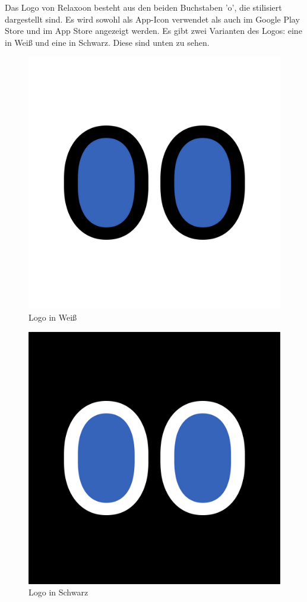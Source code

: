 Das Logo von Relaxoon besteht aus den beiden Buchstaben 'o', die stilisiert dargestellt sind.
Es wird sowohl als App-Icon verwendet als auch im Google Play Store und im App Store angezeigt werden. Es gibt zwei
Varianten des Logos: eine in Weiß und eine in Schwarz. Diese sind unten zu sehen.


\begin{figure}[H]
    \centering
    \includegraphics[height=0.5\textwidth]{./pics/Relaxoon Logo White.jpg}
    \caption{Logo in Weiß}
\end{figure}

\begin{figure}[H]
    \centering
    \includegraphics[height=0.5\textwidth]{./pics/Relaxoon Logo Black.jpg}
    \caption{Logo in Schwarz}
\end{figure}